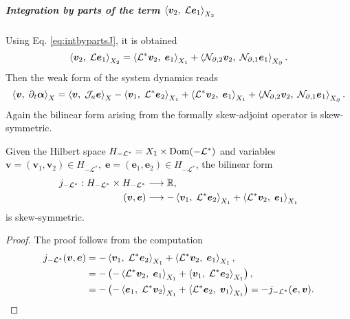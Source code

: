 \subparagraph{Integration by parts of the term $\inner[X_2]{\bm{v}_2}{\mathcal{L}\bm{e}_1}$}
Using Eq. \eqref{eq:intbypartsJ}, it is obtained 
\begin{equation}
\inner[X_2]{\bm{v}_2}{\mathcal{L}\bm{e}_1} = \inner[X_1]{\mathcal{L}^*\bm{v}_2}{\bm{e}_1} + \inner[X_\partial]{\mathcal{N}_{\partial, 2} \bm{v}_2}{\mathcal{N}_{\partial, 1} \bm{e}_1}.
\end{equation}
Then the weak form of the system dynamics  reads 
\begin{equation}\label{eq:weak_dyn_intJ2}
\inner[X]{\bm{v}}{\partial_t \bm{\alpha}} =  \inner[X]{\bm{v}}{\mathcal{J}_a\bm{e}} -\inner[X_1]{\bm{v}_1}{\mathcal{L}^*\bm{e}_2} + \inner[X_1]{\mathcal{L}^*\bm{v}_2}{\bm{e}_1} + \inner[X_\partial]{\mathcal{N}_{\partial, 2} \bm{v}_2}{\mathcal{N}_{\partial, 1} \bm{e}_1}. 
\end{equation}
Again the bilinear form arising from the formally skew-adjoint operator is skew-symmetric.
\begin{proposition}
	Given the Hilbert space $H_{-\mathcal{L}^*} = X_1 \times \Dom(-\mathcal{L}^*)$ and variables $\bm{v} = (\bm{v}_1, \bm{v}_2) \in H_{-\mathcal{L}^*}, \; \bm{e} = (\bm{e}_1, \bm{e}_2) \in H_{-\mathcal{L}^*}$, the bilinear form 
	\begin{equation*}
	\begin{aligned}
	j_{-\mathcal{L}^*}: H_{-\mathcal{L}^*} \times H_{-\mathcal{L}^*} &\longrightarrow \mathbb{R}, \\
	(\bm{v}, \bm{e}) &\longrightarrow -\inner[X_1]{\bm{v}_1}{\mathcal{L}^*\bm{e}_2} + \inner[X_1]{\mathcal{L}^*\bm{v}_2}{\bm{e}_1}
	\end{aligned}
	\end{equation*}
	is skew-symmetric.
	\begin{proof}
		The proof follows from the computation
		\begin{equation*}
		\begin{aligned}
		j_{-\mathcal{L}^*}(\bm{v}, \bm{e}) &= -\inner[X_1]{\bm{v}_1}{\mathcal{L}^*\bm{e}_2} + \inner[X_1]{\mathcal{L}^*\bm{v}_2}{\bm{e}_1}, \\
		&= - \left(-\inner[X_1]{\mathcal{L}^*\bm{v}_2}{\bm{e}_1} + \inner[X_1]{\bm{v}_1}{\mathcal{L}^*\bm{e}_2}\right), \\
		&= - \left(-\inner[X_1]{\bm{e}_1}{\mathcal{L}^*\bm{v}_2} + \inner[X_1]{\mathcal{L}^*\bm{e}_2}{\bm{v}_1}\right) = - j_{-\mathcal{L}^*}(\bm{e}, \bm{v}).
		\end{aligned}
		\end{equation*}
	\end{proof}
\end{proposition}


